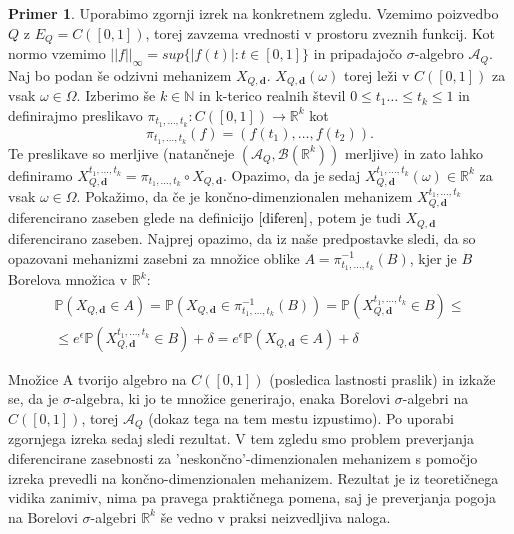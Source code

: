\documentclass[12pt,a4paper]{amsart}
\theoremstyle{definition} %
\newtheorem{primer}[definicija]{Primer}
\theoremstyle{plain} %
\begin{document}
\begin{primer}
Uporabimo zgornji izrek na konkretnem zgledu. Vzemimo poizvedbo $Q$ z $E_Q = C([0,1])$, torej zavzema vrednosti v prostoru zveznih funkcij. Kot normo vzemimo $||f||_\infty = sup\{|f(t)| : t \in [0,1]\}$ in pripadajočo $\sigma$-algebro $\mathcal{A}_Q$. Naj bo podan še odzivni mehanizem $X_{Q,\textbf{d}}$. $X_{Q,\textbf{d}}(\omega)$ torej leži v $C([0,1])$ za vsak $\omega \in \Omega$.
\newline
Izberimo še $k \in \mathbb{N}$ in k-terico realnih števil $0 \leq t_1 \ldots \leq t_k \leq 1$ in definirajmo preslikavo $ \pi _{t_1,\ldots,t_k}: C([0,1]) \rightarrow \mathbb{R}^k$ kot $$\pi _{t_1,\ldots,t_k}(f) = (f(t_1),\ldots,f(t_2)).$$ Te preslikave so merljive (natančneje $(\mathcal{A}_Q, \mathcal{B}(\mathbb{R}^k))$ merljive) in zato lahko definiramo $X_{Q,\textbf{d}}^{t_1,\ldots,t_k} = \pi _{t_1,\ldots,t_k} \circ X_{Q,\textbf{d}}$. Opazimo, da je sedaj $X_{Q,\textbf{d}}^{t_1,\ldots,t_k} (\omega) \in \mathbb{R}^k$ za vsak $\omega \in \Omega$. Pokažimo, da če je končno-dimenzionalen mehanizem $X_{Q,\textbf{d}}^{t_1,\ldots,t_k}$ diferencirano zaseben glede na definicijo $\eqref{diferen}$, potem je tudi $X_{Q,\textbf{d}}$ diferencirano zaseben. Najprej opazimo, da iz naše predpostavke sledi, da so opazovani mehanizmi zasebni za množice oblike $A = \pi _{t_1,\ldots,t_k}^{-1}(B)$, kjer je $B$ Borelova množica v $\mathbb{R}^k$: 
\begin{equation*}
\begin{split}
\mathbb{P}(X_{Q,\textbf{d}} \in A) =  \mathbb{P}(X_{Q,\textbf{d}} \in \pi _{t_1,\ldots,t_k}^{-1}(B)) = \mathbb{P}(X_{Q,\textbf{d}}^{t_1,\ldots,t_k} \in B) \leq \\
 \leq e^{\epsilon}\mathbb{P}(X_{Q,\textbf{d}}^{t_1,\ldots,t_k} \in B) + \delta = e^{\epsilon}\mathbb{P}(X_{Q,\textbf{d}} \in A) + \delta
\end{split}
\end{equation*}


Množice A tvorijo algebro na $C([0,1])$ (posledica lastnosti praslik) in izkaže se, da je $\sigma$-algebra, ki jo te množice generirajo, enaka  Borelovi $\sigma$-algebri na $C([0,1])$, torej $\mathcal{A}_Q$ (dokaz tega na tem mestu izpustimo). Po uporabi zgornjega izreka sedaj sledi rezultat.
\newline
\newline
V tem zgledu smo problem preverjanja diferencirane zasebnosti za 'neskončno'-dimenzionalen mehanizem s pomočjo izreka prevedli na končno-dimenzionalen mehanizem. Rezultat je iz teoretičnega vidika zanimiv, nima pa pravega praktičnega pomena, saj je preverjanja pogoja na Borelovi $\sigma$-algebri $\mathbb{R}^k$ še vedno v praksi neizvedljiva naloga.
\end{primer}
\end{document}
